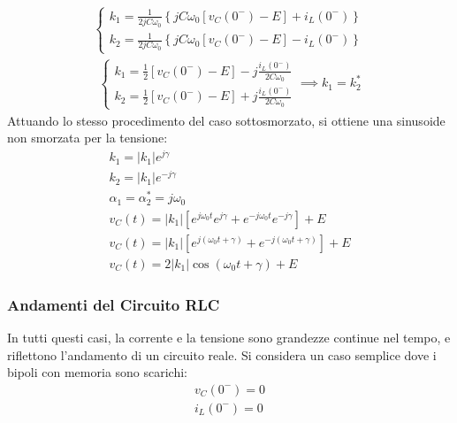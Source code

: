 \documentclass{article}
\numberwithin{equation}{subsection}
\begin{document}
\begin{gather*}
    \begin{cases}
        k_1=\displaystyle\frac{1}{2jC\omega_0}\left\{jC\omega_0\left[v_C(0^-)-E\right]+i_L(0^-)\right\}\\
        k_2=\displaystyle\frac{1}{2jC\omega_0}\left\{jC\omega_0\left[v_C(0^-)-E\right]-i_L(0^-)\right\}
    \end{cases}
\end{gather*}
\begin{gather*}
    \begin{cases}
        k_1=\displaystyle\frac{1}{2}\left[v_C(0^-)-E\right]-j\frac{i_L(0^-)}{2C\omega_0}\\
        k_2=\displaystyle\frac{1}{2}\left[v_C(0^-)-E\right]+j\frac{i_L(0^-)}{2C\omega_0}
    \end{cases}\implies k_1=k_2^*
\end{gather*}
Attuando lo stesso procedimento del caso sottosmorzato, si ottiene una sinusoide non smorzata per la tensione:
\begin{gather*}
    k_1=|k_1|e^{j\gamma}\\
    k_2=|k_1|e^{-j\gamma}\\
    \alpha_1=\alpha_2^*=j\omega_0\\
    v_C(t)=|k_1|\left[e^{j\omega_0t}e^{j\gamma}+e^{-j\omega_0t}e^{-j\gamma}\right]+E\\
    v_C(t)=|k_1|\left[e^{j(\omega_0t+\gamma)}+e^{-j(\omega_0t+\gamma)}\right]+E\\
    v_C(t)=2|k_1|\cos(\omega_0t+\gamma)+E
\end{gather*}

\subsubsection{Andamenti del Circuito RLC}
In tutti questi casi, la corrente e la tensione sono grandezze continue nel tempo, e riflettono l'andamento di un circuito reale. Si considera un caso semplice dove i 
bipoli con memoria sono scarichi:
\begin{gather*}
    v_C(0^-)=0\\
    i_L(0^-)=0
\end{gather*}
\end{document}
